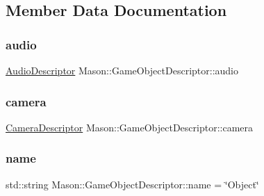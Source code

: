 \subsection{Member Data Documentation}
\hypertarget{class_mason_1_1_game_object_descriptor_a121843bc6264f0828e8672b1b390b21b}{}\label{class_mason_1_1_game_object_descriptor_a121843bc6264f0828e8672b1b390b21b} 
\subsubsection{\texorpdfstring{audio}{audio}}
{\footnotesize\ttfamily \hyperlink{class_mason_1_1_audio_descriptor}{Audio\+Descriptor} Mason\+::\+Game\+Object\+Descriptor\+::audio}

\hypertarget{class_mason_1_1_game_object_descriptor_a9b2710a89f6a1bb223594a2762340414}{}\label{class_mason_1_1_game_object_descriptor_a9b2710a89f6a1bb223594a2762340414} 
\subsubsection{\texorpdfstring{camera}{camera}}
{\footnotesize\ttfamily \hyperlink{class_mason_1_1_camera_descriptor}{Camera\+Descriptor} Mason\+::\+Game\+Object\+Descriptor\+::camera}

\hypertarget{class_mason_1_1_game_object_descriptor_aea3fddf12ef08c91e1f5e422c7521e18}{}\label{class_mason_1_1_game_object_descriptor_aea3fddf12ef08c91e1f5e422c7521e18} 
\subsubsection{\texorpdfstring{name}{name}}
{\footnotesize\ttfamily std\+::string Mason\+::\+Game\+Object\+Descriptor\+::name = \char`\"{}Object\char`\"{}}

\hypertarget{class_mason_1_1_game_object_descriptor_aa51c7f6f6a4cb0720c352cd504d4593c}{}\label{class_mason_1_1_game_object_descriptor_aa51c7f6f6a4cb0720c352cd504d4593c} 
